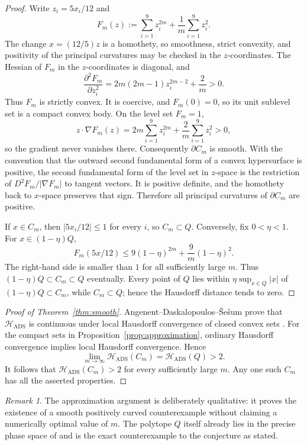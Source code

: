 \documentclass[11pt,reqno]{amsart}
\theoremstyle{remark}
\newtheorem{remark}[theorem]{Remark}
\newcommand{\Hads}{\mathcal{H}_{\mathrm{ADS}}}
\begin{document}
\begin{proof}
Write \(z_i=5x_i/12\) and
\[
 F_m(z):=\sum_{i=1}^9z_i^{2m}+\frac1m\sum_{i=1}^9z_i^2.
\]
The change \(x=(12/5)z\) is a homothety, so smoothness, strict convexity,
and positivity of the principal curvatures may be checked in the
\(z\)-coordinates.
The Hessian of \(F_m\) in the \(z\)-coordinates is diagonal, and
\[
 \frac{\partial^2F_m}{\partial z_i^2}
 =2m(2m-1)z_i^{2m-2}+\frac2m>0.
\]
Thus \(F_m\) is strictly convex.  It is coercive, and \(F_m(0)=0\), so
its unit sublevel set is a compact convex body.  On the level set \(F_m=1\),
\[
 z\cdot\nabla F_m(z)
 =2m\sum_{i=1}^9z_i^{2m}+\frac2m\sum_{i=1}^9z_i^2>0,
\]
so the gradient never vanishes there.  Consequently
\(\partial C_m\) is smooth.  With the convention that the outward second
fundamental form of a convex hypersurface is positive, the second fundamental
form of the level set in \(z\)-space is the restriction of
\(D^2F_m/|\nabla F_m|\) to tangent vectors.  It is positive definite, and
the homothety back to \(x\)-space preserves that sign.  Therefore all
principal curvatures of \(\partial C_m\) are positive.

If \(x\in C_m\), then \(|5x_i/12|\le1\) for every \(i\), so \(C_m\subset Q\).
Conversely, fix \(0<\eta<1\).  For \(x\in(1-\eta)Q\),
\[
 F_m(5x/12)
 \le9(1-\eta)^{2m}+\frac9m(1-\eta)^2.
\]
The right-hand side is smaller than \(1\) for all sufficiently large \(m\).
Thus \((1-\eta)Q\subset C_m\subset Q\) eventually.  Every point of \(Q\)
lies within \(\eta\sup_{x\in Q}|x|\) of \((1-\eta)Q\subset C_m\), while
\(C_m\subset Q\); hence the Hausdorff distance tends to zero.
\end{proof}

\begin{proof}[Proof of Theorem~\ref{thm:smooth}]
Angenent--Daskalopoulos--\v{S}e\v{s}um prove that \(\Hads\) is continuous
under local Hausdorff convergence of closed convex sets
\cite[Lemma~3.6]{ADS}.  For the compact sets in
Proposition~\ref{prop:approximation}, ordinary Hausdorff convergence implies
local Hausdorff convergence.  Hence
\[
 \lim_{m\to\infty}\Hads(C_m)=\Hads(Q)>2.
\]
It follows that \(\Hads(C_m)>2\) for every sufficiently large \(m\).  Any
one such \(C_m\) has all the asserted properties.
\end{proof}

\begin{remark}
The approximation argument is deliberately qualitative: it proves the
existence of a smooth positively curved counterexample without claiming a
numerically optimal value of \(m\).  The polytope \(Q\) itself already lies
in the precise phase space of \cite{ADS} and is the exact counterexample to
the conjecture as stated.
\end{remark}
\end{document}
